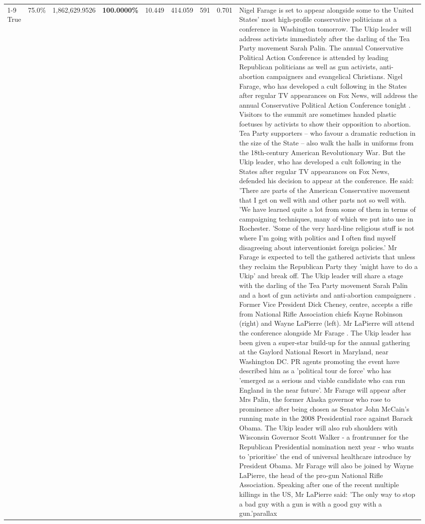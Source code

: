 \begin{table}[H]
\begin{tabular}{lllrlllll}
\cline{1-9}
True & 75.0\% & 1,862,629.9526 & \bfseries \color{red} 100.0000\% & 10.449 & 414.059 & 591 & 0.701 & Nigel Farage is set to appear alongside some to the United States' most high-profile conservative politicians at a conference in Washington tomorrow. The Ukip leader will address activists immediately after the darling of the Tea Party movement Sarah Palin. The annual Conservative Political Action Conference is attended by leading Republican politicians as well as gun activists, anti-abortion campaigners and evangelical Christians. Nigel Farage, who has developed a cult following in the States after regular TV appearances on Fox News, will address the annual Conservative Political Action Conference tonight . Visitors to the summit are sometimes handed plastic foetuses by activists to show their opposition to abortion. Tea Party supporters – who favour a dramatic reduction in the size of the State – also walk the halls in uniforms from the 18th-century American Revolutionary War. But the Ukip leader, who has developed a cult following in the States after regular TV appearances on Fox News, defended his decision to appear at the conference. He said: 'There are parts of the American Conservative movement that I get on well with and other parts not so well with. 'We have learned quite a lot from some of them in terms of campaigning techniques, many of which we put into use in Rochester. 'Some of the very hard-line religious stuff is not where I'm going with politics and I often find myself disagreeing about interventionist foreign policies.' Mr Farage is expected to tell the gathered activists that unless they reclaim the Republican Party they 'might have to do a Ukip' and break off. The Ukip leader will share a stage with the darling of the Tea Party movement Sarah Palin and a host of gun activists and anti-abortion campaigners . Former Vice President Dick Cheney, centre, accepts a rifle from National Rifle Association chiefs Kayne Robinson (right) and Wayne LaPierre (left). Mr LaPierre will attend the conference alongside Mr Farage . The Ukip leader has been given a super-star build-up for the annual gathering at the Gaylord National Resort in Maryland, near Washington DC. PR agents promoting the event have described him as a 'political tour de force' who has 'emerged as a serious and viable candidate who can run England in the near future'. Mr Farage will appear after Mrs Palin, the former Alaska governor who rose to prominence after being chosen as Senator John McCain's running mate in the 2008 Presidential race against Barack Obama. The Ukip leader will also rub shoulders with Wisconsin Governor Scott Walker - a frontrunner for the Republican Presidential nomination next year - who wants to 'prioritise' the end of universal healthcare introduce by President Obama. Mr Farage will also be joined by Wayne LaPierre, the head of the pro-gun National Rifle Association. Speaking after one of the recent multiple killings in the US, Mr LaPierre said: 'The only way to stop a bad guy with a gun is with a good guy with a gun.'parallax \\

\end{tabular}
\end{table}
